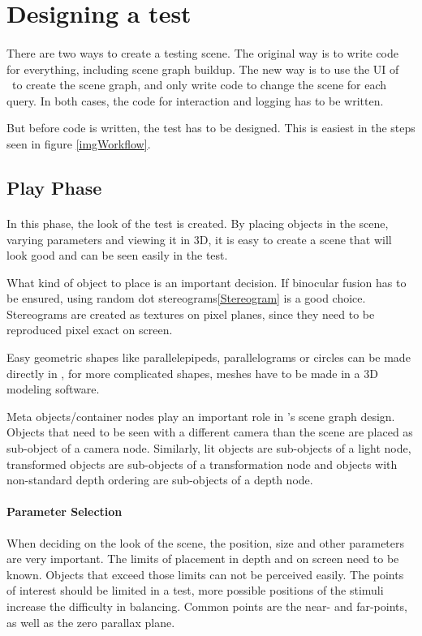 \section{Designing a test}
\paragraph{}
There are two ways to create a testing scene.
The original way is to write code for everything, including scene graph buildup.
The new way is to use the UI of \ER\ to create the scene graph,
and only write code to change the scene for each query.
In both cases, the code for interaction and logging has to be written.

But before code is written, the test has to be designed.
This is easiest in the steps seen in figure \ref{imgWorkflow}.


\subsection{Play Phase}
\paragraph{}
In this phase, the look of the test is created.
By placing objects in the scene, varying parameters and viewing it in 3D, it is easy to create a scene that will look good and can be seen easily in the test.

What kind of object to place is an important decision.
If binocular fusion has to be ensured, using random dot stereograms\ref{Stereogram} is a good choice.
Stereograms are created as textures on pixel planes, since they need to be reproduced pixel exact on screen.

Easy geometric shapes like parallelepipeds, parallelograms or circles can be made directly in \ER,
for more complicated shapes, meshes have to be made in a 3D modeling software.

Meta objects/container nodes play an important role in \ER's scene graph design.
Objects that need to be seen with a different camera than the scene are placed as sub-object of a camera node.
Similarly, lit objects are sub-objects of a light node, transformed objects are sub-objects of a transformation node and objects with non-standard depth ordering are sub-objects of a depth node.

\paragraph{Parameter Selection}
When deciding on the look of the scene, the position, size and other parameters are very important.
The limits of placement in depth and on screen need to be known. Objects that exceed those limits can not be perceived easily.
The points of interest should be limited in a test, more possible positions of the stimuli increase the difficulty in balancing.
Common points are the near- and far-points, as well as the zero parallax plane.

